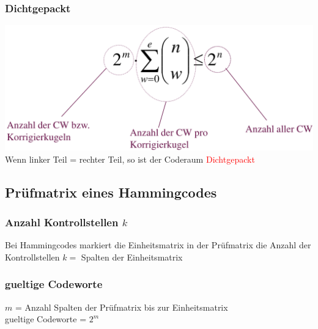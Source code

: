 \subsubsection{Dichtgepackt}
\includegraphics[width=\linewidth]{graphic/extern-reto/Dichtgepackt.png}\\
Wenn linker Teil = rechter Teil, so ist der Coderaum \textcolor{red}{Dichtgepackt}


\subsection{Prüfmatrix eines Hammingcodes}

\subsubsection{Anzahl Kontrollstellen $k$}
Bei Hammingcodes markiert die Einheitsmatrix in der Prüfmatrix die Anzahl der Kontrollstellen \colorbox{lightlightgrey}{$k = $ Spalten der Einheitsmatrix}

\subsubsection{gueltige Codeworte}
$m$ = Anzahl Spalten der Prüfmatrix bis zur Einheitsmatrix\\
\colorbox{lightlightgrey}{gueltige Codeworte = $2^m$}




\vfill
$$
\columnbreak